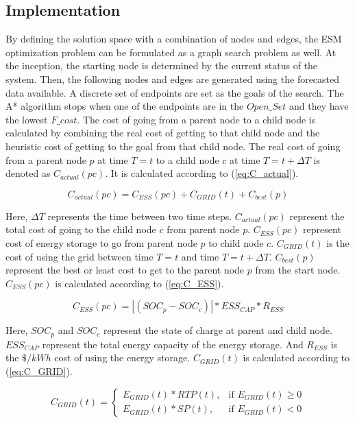 \subsection{Implementation}
By defining the solution space with a combination of nodes and edges, the ESM optimization problem can be formulated as a graph search problem as well. At the inception, the starting node is determined by the current status of the system. Then, the following nodes and edges are generated using the forecasted data available. A discrete set of endpoints are set as the goals of the search. The A* algorithm stops when one of the endpoints are in the $Open\_Set$ and they have the lowest $F\_cost$. The cost of going from a parent node to a child node is calculated by combining the real cost of getting to that child node and the heuristic cost of getting to the goal from that child node. The real cost of going from a parent node $p$ at time $T=t$ to a child node $c$ at time $T=t+\Delta T$ is denoted as $C_{actual}(pc)$. It is calculated according to (\ref{eq:C_actual}).

\begin{equation}
\label{eq:C_actual}
    C_{actual}(pc) =  C_{ESS}(pc)+C_{GRID}(t)+C_{best}(p)
\end{equation}

Here, $\Delta T$ represents the time between two time steps. $C_{actual}(pc)$ represent the total cost of going to the child node $c$ from parent node $p$. $C_{ESS}(pc)$ represent cost of energy storage to go from parent node $p$ to child node $c$. $C_{GRID}(t)$ is the cost of using the grid between time $T=t$ and time $T=t+\Delta T$. $C_{best}(p)$ represent the best or least cost to get to the parent node $p$ from the start node. $C_{ESS}(pc)$ is calculated according to (\ref{eq:C_ESS}).

\begin{equation}
\label{eq:C_ESS}
C_{ESS}(pc) = |(SOC_p - SOC_c)|*ESS_{CAP}*R_{ESS} 
\end{equation}

Here, $SOC_p$ and $SOC_c$ represent the state of charge at parent and child node. $ESS_{CAP}$ represent the total energy capacity of the energy storage. And $R_{ESS}$ is the $\$/kWh$ cost of using the energy storage. $C_{GRID}(t)$ is calculated according to (\ref{eq:C_GRID}).

\begin{equation}
\label{eq:C_GRID}
C_{GRID}(t) = 
\begin{cases}
   E_{GRID}(t)*RTP(t),& \text{if } E_{GRID}(t)\geq 0\\
    E_{GRID}(t)*SP(t),& \text{if }  E_{GRID}(t) < 0
\end{cases}
\end{equation}


